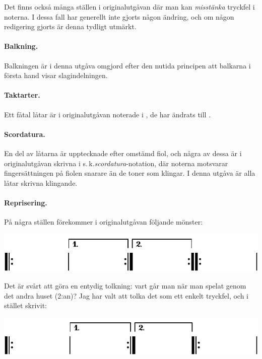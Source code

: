 {Det finns också många ställen i originalutgåvan där man kan \textit{misstänka}
tryckfel i noterna. I dessa fall har generellt inte gjorts någon ändring, och
om någon redigering gjorts är denna tydligt utmärkt.

\paragraph{Balkning.} Balkningen är i denna utgåva omgjord efter den nutida principen
att balkarna i första hand visar slagindelningen.

\begingroup
{}
\paragraph{Taktarter.} Ett fåtal låtar är i originalutgåvan noterade i ,
de har ändrats till .
\endgroup

\paragraph{Scordatura.} En del av låtarna är upptecknade efter omstämd fiol, och några av
dessa är i originalutgåvan skrivna i s.\,k.\@ \textit{scordatura}-notation, där noterna
motsvarar fingersättningen på fiolen snarare än de toner som klingar. I denna
utgåva är alla låtar skrivna klingande.

\paragraph{Reprisering.} På några ställen förekommer i originalutgåvan följande mönster:

\vspace{3mm}
\includegraphics{include/snippets/repriser-fel-crop.pdf}
\vspace{3mm}

{
\setlength{\parindent}{0em}
Det är svårt att göra en entydig tolkning: vart går man när man spelat genom det
andra \guillemotright{}huset\guillemotright{} (2:an)? Jag har valt att tolka det som ett enkelt tryckfel, och
i stället skrivit:
}

\vspace{3mm}
\includegraphics{include/snippets/repriser-ratt-crop.pdf}

}
\restoregeometry
\fancyhfoffset[E,O]{0pt}
